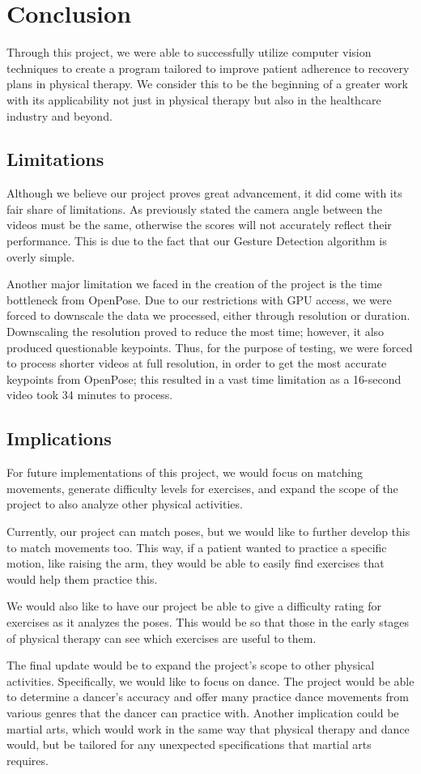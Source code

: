 \section{Conclusion}
\label{sec:conclusion}

\indent Through this project, we were able to successfully utilize computer vision 
techniques to create a program tailored to improve patient adherence to 
recovery plans in physical therapy. We consider this to be the beginning 
of a greater work with its applicability not just in physical therapy 
but also in the healthcare industry and beyond.

\subsection{Limitations}
\indent Although we believe our project proves great advancement, it did 
come with its fair share of limitations. As previously stated the camera 
angle between the videos must be the same, otherwise the scores will not 
accurately reflect their performance. This is due to the fact that our 
Gesture Detection algorithm is overly simple. 

\indent Another major limitation we faced in the creation of the project 
is the time bottleneck from OpenPose. Due to our restrictions with GPU 
access, we were forced to downscale the data we processed, either 
through resolution or duration. Downscaling the resolution proved to 
reduce the most time; however, it also produced questionable keypoints. 
Thus, for the purpose of testing, we were forced to process shorter 
videos at full resolution, in order to get the most accurate keypoints 
from OpenPose; this resulted in a vast time limitation as a 16-second 
video took 34 minutes to process.

\subsection{Implications}
\indent For future implementations of this project, we would focus on 
matching movements, generate difficulty levels for exercises, and expand 
the scope of the project to also analyze other physical activities. 

\indent Currently, our project can match poses, but we would like 
to further develop this to match movements too. This way, if a patient 
wanted to practice a specific motion, like raising the arm, they would 
be able to easily find exercises that would help them practice this. 

\indent We would also like to have our project be able to give a 
difficulty rating for exercises as it analyzes the poses. This would be 
so that those in the early stages of physical therapy can see which 
exercises are useful to them. 

\indent The final update would be to expand the project’s scope to 
other physical activities. Specifically, we would like to focus on 
dance. The project would be able to determine a dancer’s accuracy and 
offer many practice dance movements from various genres that the 
dancer can practice with. Another implication could be martial arts, 
which would work in the same way that physical therapy and dance would, 
but be tailored for any unexpected specifications that martial arts 
requires. 
